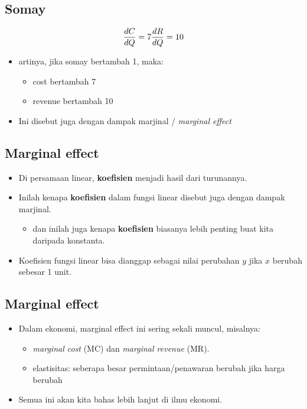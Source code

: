 \documentclass[
  letterpaper,
  DIV=11,
  numbers=noendperiod]{scrartcl}
\providecommand{\tightlist}{%
  \setlength{\itemsep}{0pt}\setlength{\parskip}{0pt}}\usepackage{longtable,booktabs,array}
\begin{document}
\subsection{Somay}\label{somay-1}

\[
\frac{dC}{dQ}=7 \\
\frac{dR}{dQ}=10
\]

\begin{itemize}
\item
  artinya, jika somay bertambah 1, maka:

  \begin{itemize}
  \item
    cost bertambah 7
  \item
    revenue bertambah 10
  \end{itemize}
\item
  Ini disebut juga dengan dampak marjinal / \emph{marginal effect}
\end{itemize}

\subsection{Marginal effect}\label{marginal-effect}

\begin{itemize}
\item
  Di persamaan linear, \textbf{koefisien} menjadi hasil dari turunannya.
\item
  Inilah kenapa \textbf{koefisien} dalam fungsi linear disebut juga
  dengan dampak marjinal.

  \begin{itemize}
  \tightlist
  \item
    dan inilah juga kenapa \textbf{koefisien} biasanya lebih penting
    buat kita daripada konstanta.
  \end{itemize}
\item
  Koefisien fungsi linear bisa dianggap sebagai nilai perubahan \(y\)
  jika \(x\) berubah sebesar 1 unit.
\end{itemize}

\subsection{Marginal effect}\label{marginal-effect-1}

\begin{itemize}
\item
  Dalam ekonomi, marginal effect ini sering sekali muncul, misalnya:

  \begin{itemize}
  \item
    \emph{marginal cost} (MC) dan \emph{marginal revenue} (MR).
  \item
    elastisitas: seberapa besar permintaan/penawaran berubah jika harga
    berubah
  \end{itemize}
\item
  Semua ini akan kita bahas lebih lanjut di ilmu ekonomi.
\end{itemize}
\end{document}
